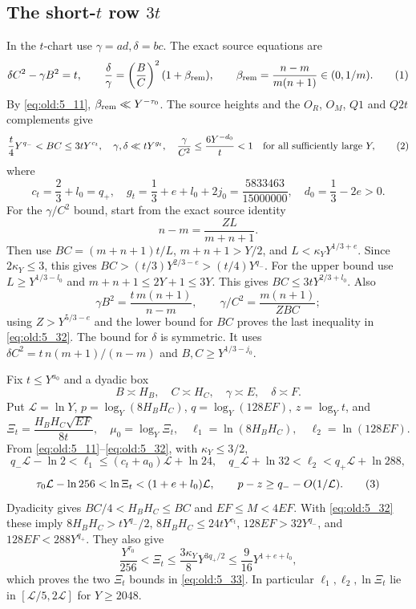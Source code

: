 \subsection*{The short-\(t\) row \(3t\)}

In the \(t\)-chart use \(\gamma=ad,\delta=bc\). The exact source equations
are
\[
 \delta C^2-\gamma B^2=t,\qquad
 \frac{\delta}{\gamma}=\left(\frac BC\right)^2(1+\beta_{\rm rem}),\qquad
 \beta_{\rm rem}=\frac{n-m}{m(n+1)}\in(0,1/m).
\AutoTag{eq:old:5_31}
\]
By \eqref{eq:old:5_11}, \(\beta_{\rm rem}\ll Y^{-\tau_0}\). The source heights and the
\(O_R\), \(O_M\), \(Q1\) and \(Q2t\) complements give
\[
 \frac t4Y^{q_-}<BC\le3tY^{c_t},\quad
 \gamma,\delta\ll tY^{g_t},\quad
 \frac{\gamma}{C^2}\le \frac{6Y^{-d_0}}t<1
 \quad\text{for all sufficiently large }Y,
\AutoTag{eq:old:5_32}
\]
where
\[
 c_t=\frac23+l_0=q_+,\quad
 g_t=\frac13+e+l_0+2j_0=\frac{5833463}{15000000},\quad
 d_0=\frac13-2e>0.
\]
For the \(\gamma/C^2\) bound, start from the exact source identity
\[
 n-m=\frac{ZL}{m+n+1}.
\]
Then use
\(BC=(m+n+1)t/L\), \(m+n+1>Y/2\), and
\(L<\kappa_Y Y^{1/3+e}\). Since \(2\kappa_Y\le3\), this gives
\(BC>(t/3)Y^{2/3-e}>(t/4)Y^{q_-}\). For the upper bound use
\(L\ge Y^{1/3-l_0}\) and \(m+n+1\le2Y+1\le3Y\). This gives
\(BC\le3tY^{2/3+l_0}\). Also
\[
 \gamma B^2=\frac{t\,m(n+1)}{n-m},\qquad
 \gamma/C^2=\frac{m(n+1)}{ZBC};
\]
using \(Z>Y^{5/3-e}\) and the lower bound for \(BC\) proves the last
inequality in \eqref{eq:old:5_32}. The bound for \(\delta\) is symmetric. It uses
\(\delta C^2=t\,n(m+1)/(n-m)\) and \(B,C\ge Y^{1/3-j_0}\).

Fix \(t\le Y^{a_0}\) and a dyadic box
\[
 B\asymp H_B,\quad C\asymp H_C,\quad
 \gamma\asymp E,\quad\delta\asymp F.
\]
Put \(\mathcal L=\ln Y\), \(p=\log_Y(8H_BH_C)\),
\(q=\log_Y(128EF)\), \(z=\log_Yt\), and
\[
 \Xi_t=\frac{H_BH_C\sqrt{EF}}{8t},\quad
 \mu_0=\log_Y \Xi_t,\quad
 \ell_1=\ln(8H_BH_C),\quad \ell_2=\ln(128EF).
\]
From \eqref{eq:old:5_11}--\eqref{eq:old:5_32}, with \(\kappa_Y\le3/2\),
\[
 q_-\mathcal L-\ln2<\ell_1\le(c_t+a_0)\mathcal L+\ln24,\quad
 q_-\mathcal L+\ln32<\ell_2<q_+\mathcal L+\ln288,
\]
\[
 \tau_0\mathcal L-\ln256<\ln \Xi_t<(1+e+l_0)\mathcal L,\qquad
 p-z\ge q_--O(1/\mathcal L).
\AutoTag{eq:old:5_33}
\]
Dyadicity gives \(BC/4<H_BH_C\le BC\) and
\(EF\le M<4EF\). With \eqref{eq:old:5_32} these imply
\(8H_BH_C>tY^{q_-}/2\),
\(8H_BH_C\le24tY^{c_t}\),
\(128EF>32Y^{q_-}\), and \(128EF<288Y^{q_+}\).
They also give
\[
 \frac{Y^{\tau_0}}{256}<\Xi_t
 \le\frac{3\kappa_Y}{8}Y^{3q_+/2}
 \le\frac9{16}Y^{1+e+l_0},
\]
which proves the two \(\Xi_t\) bounds in \eqref{eq:old:5_33}.
In particular \(\ell_1,\ell_2,\ln \Xi_t\) lie in
\([\mathcal L/5,2\mathcal L]\) for \(Y\ge2048\).

